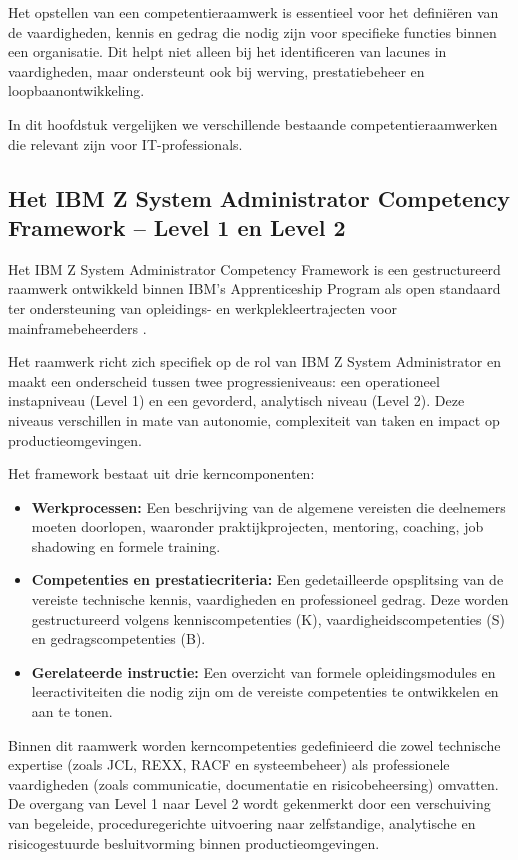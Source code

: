 Het opstellen van een competentieraamwerk is essentieel voor het definiëren van de vaardigheden, kennis en gedrag die nodig zijn voor specifieke functies binnen een organisatie. Dit helpt niet alleen bij het identificeren van lacunes in vaardigheden, maar ondersteunt ook bij werving, prestatiebeheer en loopbaanontwikkeling. 

In dit hoofdstuk vergelijken we verschillende bestaande competentieraamwerken die relevant zijn voor IT-professionals.
\subsection{Het IBM Z System Administrator Competency Framework – Level 1 en Level 2}

Het IBM Z System Administrator Competency Framework is een gestructureerd raamwerk ontwikkeld binnen IBM’s Apprenticeship Program als open standaard ter ondersteuning van opleidings- en werkplekleertrajecten voor mainframebeheerders \autocite{ibm_level1_framework,ibm_level2_framework}. 

Het raamwerk richt zich specifiek op de rol van IBM Z System Administrator en maakt een onderscheid tussen twee progressieniveaus: een operationeel instapniveau (Level 1) en een gevorderd, analytisch niveau (Level 2). Deze niveaus verschillen in mate van autonomie, complexiteit van taken en impact op productieomgevingen.

Het framework bestaat uit drie kerncomponenten:

\begin{itemize}
	\item \textbf{Werkprocessen:} Een beschrijving van de algemene vereisten die deelnemers moeten doorlopen, waaronder praktijkprojecten, mentoring, coaching, job shadowing en formele training.
	\item \textbf{Competenties en prestatiecriteria:} Een gedetailleerde opsplitsing van de vereiste technische kennis, vaardigheden en professioneel gedrag. Deze worden gestructureerd volgens kenniscompetenties (K), vaardigheidscompetenties (S) en gedragscompetenties (B).
	\item \textbf{Gerelateerde instructie:} Een overzicht van formele opleidingsmodules en leeractiviteiten die nodig zijn om de vereiste competenties te ontwikkelen en aan te tonen.
\end{itemize}

Binnen dit raamwerk worden kerncompetenties gedefinieerd die zowel technische expertise (zoals JCL, REXX, RACF en systeembeheer) als professionele vaardigheden (zoals communicatie, documentatie en risicobeheersing) omvatten. De overgang van Level 1 naar Level 2 wordt gekenmerkt door een verschuiving van begeleide, proceduregerichte uitvoering naar zelfstandige, analytische en risicogestuurde besluitvorming binnen productieomgevingen.

